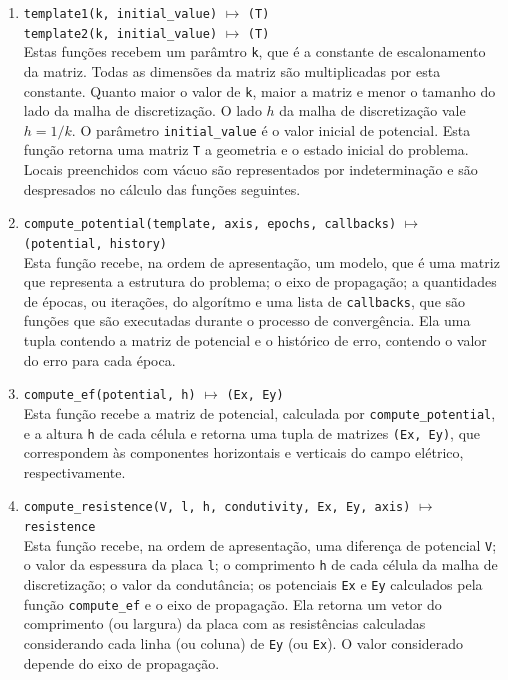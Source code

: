 \documentclass{aleph-revista}
\begin{document}
\begin{enumerate}
  \item \texttt{template1(k, initial\_value)} $\mapsto$ \texttt{(T)}\\ \texttt{template2(k, initial\_value)} $\mapsto$ \texttt{(T)} \hfill \\
        Estas funções recebem um parâmtro \texttt{k}, que é a constante de escalonamento da matriz. Todas as dimensões da matriz são multiplicadas por esta constante. Quanto maior o valor de \texttt{k}, maior a matriz e menor o tamanho do lado da malha de discretização. O lado $h$ da malha de discretização vale $h=1/k$. O parâmetro \texttt{initial\_value} é o valor inicial de potencial. Esta função retorna uma matriz \texttt{T} a geometria e o estado inicial do problema. Locais preenchidos com vácuo são representados por indeterminação e são despresados no cálculo das funções seguintes.
  \item \texttt{compute\_potential(template, axis, epochs, callbacks)} $\mapsto$ \texttt{(potential, history)} \hfill \\
        Esta função recebe, na ordem de apresentação, um modelo, que é uma matriz que representa a estrutura do problema; o eixo de propagação; a quantidades de épocas, ou iterações, do algorítmo e uma lista de \texttt{callbacks}, que são funções que são executadas durante o processo de convergência. Ela uma tupla contendo a matriz de potencial e o histórico de erro, contendo o valor do erro para cada época.
  \item \texttt{compute\_ef(potential, h)} $\mapsto$ \texttt{(Ex, Ey)} \hfill \\
        Esta função recebe a matriz de potencial, calculada por \texttt{compute\_potential}, e a altura \texttt{h} de cada célula e retorna uma tupla de matrizes \texttt{(Ex, Ey)}, que correspondem às componentes horizontais e verticais do campo elétrico, respectivamente.
  \item \texttt{compute\_resistence(V, l, h, condutivity, Ex, Ey, axis)} $\mapsto$ \texttt{resistence} \hfill \\
        Esta função recebe, na ordem de apresentação, uma diferença de potencial \texttt{V}; o valor da espessura da placa \texttt{l}; o comprimento \texttt{h} de cada célula da malha de discretização; o valor da condutância; os potenciais \texttt{Ex} e \texttt{Ey} calculados pela função \texttt{compute\_ef} e o eixo de propagação. Ela retorna um vetor do comprimento (ou largura) da placa com as resistências calculadas considerando cada linha (ou coluna) de \texttt{Ey} (ou \texttt{Ex}). O valor considerado depende do eixo de propagação.
\end{enumerate}
\end{document}
